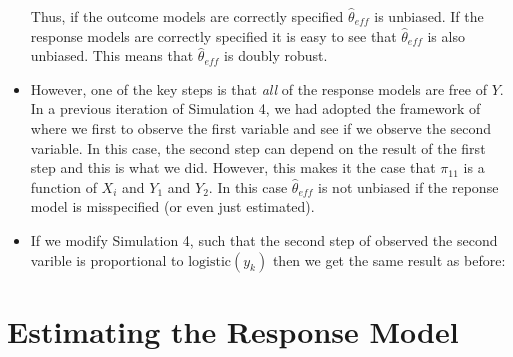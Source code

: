 \documentclass[12pt]{article}
\newcommand{\logistic}{{\text{logistic}}}
\begin{document}
\begin{itemize}
    Thus, if the outcome models are correctly specified $\hat \theta_{eff}$ is
    unbiased. If the response models are correctly specified it is easy to see
    that $\hat \theta_{eff}$ is also unbiased. This means that $\hat
    \theta_{eff}$ is doubly robust.

  \item However, one of the key steps is that \textit{all} of the response
    models are free of $Y$. In a previous iteration of Simulation 4, we had
    adopted the framework of \cite{robins1997non} where we first to observe the
    first variable and see if we observe the second variable. In this case, the
    second step can depend on the result of the first step and this is what we
    did. However, this makes it the case that $\pi_11$ is a function of $X_i$
    and $Y_1$ and $Y_2$. In this case $\hat \theta_{eff}$ is not unbiased if the
    reponse model is misspecified (or even just estimated).

  \item If we modify Simulation 4, such that the second step of observed the
    second varible is proportional to $\logistic(y_k)$ then we get the same
    result as before:

    
    
    
  
\end{itemize}

\newpage

\section*{Estimating the Response Model}
\end{document}
